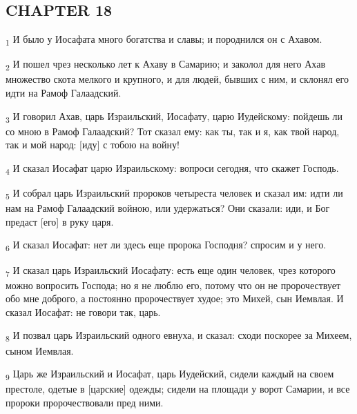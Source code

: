 \subsection{CHAPTER 18}
\begin{tcolorbox}
\textsubscript{1} И было у Иосафата много богатства и славы; и породнился он с Ахавом.
\end{tcolorbox}
\begin{tcolorbox}
\textsubscript{2} И пошел чрез несколько лет к Ахаву в Самарию; и заколол для него Ахав множество скота мелкого и крупного, и для людей, бывших с ним, и склонял его идти на Рамоф Галаадский.
\end{tcolorbox}
\begin{tcolorbox}
\textsubscript{3} И говорил Ахав, царь Израильский, Иосафату, царю Иудейскому: пойдешь ли со мною в Рамоф Галаадский? Тот сказал ему: как ты, так и я, как твой народ, так и мой народ: [иду] с тобою на войну!
\end{tcolorbox}
\begin{tcolorbox}
\textsubscript{4} И сказал Иосафат царю Израильскому: вопроси сегодня, что скажет Господь.
\end{tcolorbox}
\begin{tcolorbox}
\textsubscript{5} И собрал царь Израильский пророков четыреста человек и сказал им: идти ли нам на Рамоф Галаадский войною, или удержаться? Они сказали: иди, и Бог предаст [его] в руку царя.
\end{tcolorbox}
\begin{tcolorbox}
\textsubscript{6} И сказал Иосафат: нет ли здесь еще пророка Господня? спросим и у него.
\end{tcolorbox}
\begin{tcolorbox}
\textsubscript{7} И сказал царь Израильский Иосафату: есть еще один человек, чрез которого можно вопросить Господа; но я не люблю его, потому что он не пророчествует обо мне доброго, а постоянно пророчествует худое; это Михей, сын Иемвлая. И сказал Иосафат: не говори так, царь.
\end{tcolorbox}
\begin{tcolorbox}
\textsubscript{8} И позвал царь Израильский одного евнуха, и сказал: сходи поскорее за Михеем, сыном Иемвлая.
\end{tcolorbox}
\begin{tcolorbox}
\textsubscript{9} Царь же Израильский и Иосафат, царь Иудейский, сидели каждый на своем престоле, одетые в [царские] одежды; сидели на площади у ворот Самарии, и все пророки пророчествовали пред ними.
\end{tcolorbox}
